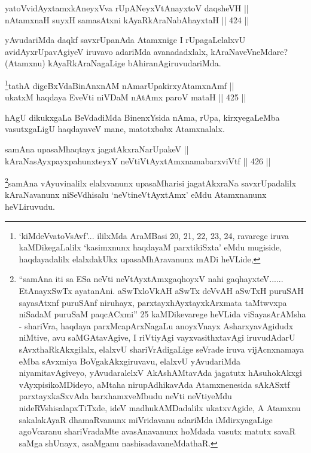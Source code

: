 \begin{shl}
yatoV\s vidAyxtamxkAneyxVva rUpANeyxVtAnayxtoV daqsheVH || \\
nA\s \s tamxnaH suyxH samasAtxni kAyaRkAraNabAhayxtaH \hfill || 424 || 
\end{shl}

\begin{artha}
yAvudariMda daqkf savxrUpanAda Atamxnige I rUpagaLelalxvU
avidAyxrUpavAgiyeV iruvavo adariMda avanadadxlalx, kAraNaveVneMdare?
(Atamxnu) kAyaRkAraNagaLige bAhiranAgiruvudariMda.
\end{artha}


\begin{shl}
\footnote{`kiMdeVvatoV\s sAvf'... ililxMda AraMBasi 20, 21, 22, 23,
24, ravarege iruva kaMDikegaLalilx `kasimxnunx haqdayaM
parxtikiSxta' eMdu mugiside, haqdayadalilx elalxdakUkx
upasaMhAravanunx mADi heVLide,}tathA digeBxVdaBinAnxnAM nAmarUpakirxyAtamxnAmf || \\
ukatxM haqdaya EveVti niVDaM nA\s \s tAmx paroV mataH \hfill || 425 ||  
\end{shl}

\begin{artha}
hAgU dikukxgaLa BeVdadiMda BinenxYsida nAma, rUpa,
kirxyegaLeMba vasutxgaLigU haqdayaveV mane, matotxbabx Atamxnalalx.
\end{artha}


\begin{shl}
samAna upasaMhaqtayx jagatAkxraNarUpakeV || \\
kAraNasAyxpayxpahunxteyxY neVtiVtAyxtAmxnamabarxviVtf \hfill || 426 ||  
\end{shl}

\begin{artha}
\footnote{``samAna iti sa ESa neVti neVtAyxtAmxgaqhoyxV nahi gaqhayxteV...... EtAnayxSwTx ayatanAni. aSwTxloVkAH aSwTx deVvAH aSwTxH puruSAH sayasAtxnf puruSAnf niruhayx, parxtayxhAyxtayxkArxmata taMtwvxpa niSadaM puruSaM paqcACxmi'' 25 kaMDikevarege heVLida viSayasArAMsha - shariVra, haqdaya parxMcapArxNagaLu anoyxVnayx AsharxyavAgidudx niMtive, avu saMGAtavAgive, I riVtiyAgi vayxvasithxtavAgi iruvudAdarU sAvxthaRkAkxgilalx, elalxvU shariVrAdigaLige seVrade iruva vijAcnxnamaya eMba sAvxmiya BoVgakAkxgiruvavu, elalxvU yAvudariMda niyamitavAgiveyo, yAvudaralelxV AkAshAMtavAda jagatutx hAsuhokAkxgi vAyxpisikoMDideyo, aMtaha nirupAdhikavAda Atamxnenesida sAkASxtf parxtayxkaSxvAda barxhamxveMbudu neVti neVtiyeMdu nideRVshisalapxTiTxde, ideV madhukAMDadalilx ukatxvAgide, A Atamxnu sakalakAyaR dhamaRvanunx miVridavanu adariMda iMdirxyagaLige agoVcaranu shariVradaMte avasAnavanunx hoMdada vasutx matutx savaR saMga shUnayx, asaMganu nashisadavaneMdathaR.}samAna vAyuvinalilx elalxvanunx upasaMharisi jagatAkxraNa savxrUpadalilx kAraNavanunx niSeVdhisalu `neVtineVtAyxtAmx' eMdu Atamxnanunx heVLiruvudu.
\end{artha}


